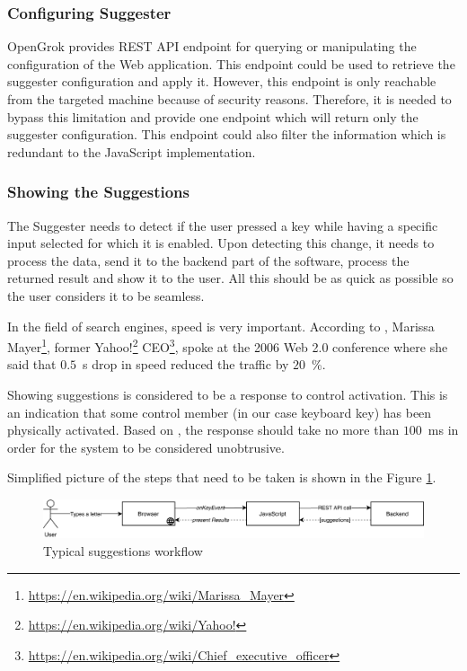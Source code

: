 \subsubsection{Configuring Suggester}
OpenGrok provides REST API endpoint for querying or manipulating the configuration of the Web application.
This endpoint could be used to retrieve the suggester configuration and apply it.
However, this endpoint is only reachable from the targeted machine because of security reasons.
Therefore, it is needed to bypass this limitation and provide one endpoint which will return only the suggester configuration.
This endpoint could also filter the information which is redundant to the JavaScript implementation.

\subsubsection{Showing the Suggestions}
\label{showing_suggestions}

The Suggester needs to detect if the user pressed a key while having a specific input selected for which it is enabled. Upon
detecting this change, it needs to process the data, send it to the backend part of the software, process the returned
result and show it to
the user. All this should be as quick as possible so the user considers it to be seamless.

In the field of search engines, speed is very important. According to \citep{marissa_mayers},
Marissa Mayer\footnote{\url{https://en.wikipedia.org/wiki/Marissa\_Mayer}}, former
Yahoo!\footnote{\url{https://en.wikipedia.org/wiki/Yahoo!}}
CEO\footnote{\url{https://en.wikipedia.org/wiki/Chief_executive_officer}}, spoke at the
2006 Web 2.0 conference where she said that $0.5$~s drop in speed reduced the traffic by $20$~\%.

Showing suggestions is considered to be a response to control activation. This is an indication that some control member
(in our case keyboard key) has been physically activated. Based on \citep{response_time}, the response
should take no more than $100$~ms in order for the system to be considered unobtrusive.

Simplified picture of the
steps that need to be taken is shown in the Figure \ref{suggest_sequence}.

\begin{figure}[htbp]
\centering
\includegraphics[width=145mm]{../img/opengrok_sequence.pdf}
\caption{Typical suggestions workflow}
\label{suggest_sequence}
\end{figure}

